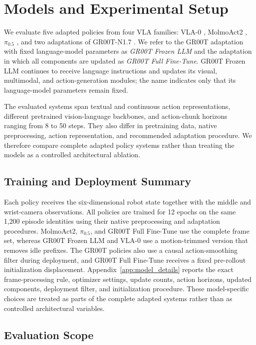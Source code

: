 \documentclass[conference]{IEEEtran}
\begin{document}
\section{Models and Experimental Setup}
\label{sec:models_setup}

We evaluate five adapted policies from four VLA families: VLA-0 \cite{goyal2025vla0}, MolmoAct2 \cite{fang2026molmoact2}, $\pi_{0.5}$ \cite{black2025pi05}, and two adaptations of GR00T-N1.7 \cite{nvidia2025gr00t}. We refer to the GR00T adaptation with fixed language-model parameters as \emph{GR00T Frozen LLM} and the adaptation in which all components are updated as \emph{GR00T Full Fine-Tune}. GR00T Frozen LLM continues to receive language instructions and updates its visual, multimodal, and action-generation modules; the name indicates only that its language-model parameters remain fixed.

The evaluated systems span textual and continuous action representations, different pretrained vision-language backbones, and action-chunk horizons ranging from 8 to 50 steps. They also differ in pretraining data, native preprocessing, action representation, and recommended adaptation procedure. We therefore compare complete adapted policy systems rather than treating the models as a controlled architectural ablation.

\subsection{Training and Deployment Summary}

Each policy receives the six-dimensional robot state together with the middle and wrist-camera observations. All policies are trained for 12 epochs on the same 1,200 episode identities using their native preprocessing and adaptation procedures. MolmoAct2, $\pi_{0.5}$, and GR00T Full Fine-Tune use the complete frame set, whereas GR00T Frozen LLM and VLA-0 use a motion-trimmed version that removes idle prefixes. The GR00T policies also use a causal action-smoothing filter during deployment, and GR00T Full Fine-Tune receives a fixed pre-rollout initialization displacement. Appendix~\ref{app:model_details} reports the exact frame-processing rule, optimizer settings, update counts, action horizons, updated components, deployment filter, and initialization procedure. These model-specific choices are treated as parts of the complete adapted systems rather than as controlled architectural variables.

\subsection{Evaluation Scope}
\end{document}

